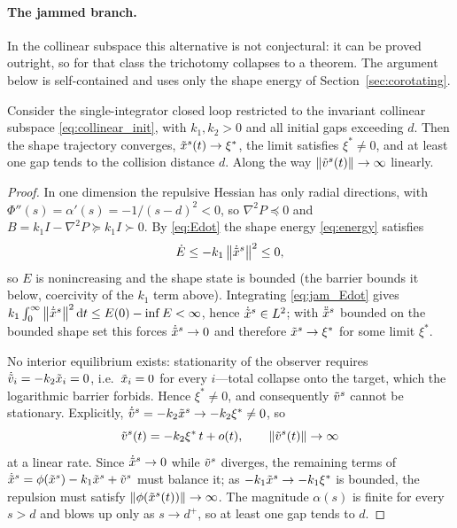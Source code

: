 \paragraph{The jammed branch.}
\label{sec:jam}
In the collinear subspace this alternative is not conjectural: it can be proved outright, so for that
class the trichotomy collapses to a theorem. The argument below is self-contained and uses only the shape
energy of Section~\ref{sec:corotating}.

\begin{proposition}\label{prop:jam}
Consider the single-integrator closed loop restricted to the invariant collinear subspace
\eqref{eq:collinear_init}, with $k_1,k_2>0$ and all initial gaps exceeding $d$. Then the shape
trajectory converges, $\tilde{x}^s(t)\to\xi^*$, the limit satisfies $\xi^*\ne0$, and at least one gap
tends to the collision distance $d$. Along the way $\left\| \tilde{v}^s(t) \right\|\to\infty$ linearly.
\end{proposition}

\begin{proof}
In one dimension the repulsive Hessian has only radial directions, with
$\Phi''(s)=\alpha'(s)=-1/(s-d)^2<0$, so $\nabla^2P\preceq0$ and
$B=k_1I-\nabla^2P\succeq k_1I\succ0$. By \eqref{eq:Edot} the shape energy \eqref{eq:energy} satisfies
\begin{equation}
  \dot E\le-k_1\left\| \dot{\tilde{x}}^s \right\|^2\le0 ,
  \label{eq:jam_Edot}
\end{equation}
so $E$ is nonincreasing and the shape state is bounded (the barrier bounds it below, coercivity of
the $k_1$ term above). Integrating \eqref{eq:jam_Edot} gives
$k_1\int_0^\infty\left\| \dot{\tilde{x}}^s \right\|^2\mathrm{d} t\le E(0)-\inf E<\infty$, hence
$\dot{\tilde{x}}^s\in L^2$; with $\ddot{\tilde{x}}^s$ bounded on the bounded shape set this forces
$\dot{\tilde{x}}^s\to0$ and therefore $\tilde{x}^s\to\xi^*$ for some limit $\xi^*$.

No interior equilibrium exists: stationarity of the observer requires $\dot{\tilde{v}}_i=-k_2\tilde{x}_i=0$,
i.e.\ $\tilde{x}_i=0$ for every $i$---total collapse onto the target, which the logarithmic barrier
forbids. Hence $\xi^*\ne0$, and consequently $\tilde{v}^s$ cannot be stationary. Explicitly,
$\dot{\tilde{v}}^s=-k_2\tilde{x}^s\to-k_2\xi^*\ne0$, so
\begin{equation}
  \tilde{v}^s(t)=-k_2\xi^*\,t+o(t),
  \qquad \left\| \tilde{v}^s(t) \right\|\to\infty
  \label{eq:jam_vdiv}
\end{equation}
at a linear rate. Since $\dot{\tilde{x}}^s\to0$ while $\tilde{v}^s$ diverges, the remaining terms of
$\dot{\tilde{x}}^s=\phi(\tilde{x}^s)-k_1\tilde{x}^s+\tilde{v}^s$ must balance it; as $-k_1\tilde{x}^s\to-k_1\xi^*$ is
bounded, the repulsion must satisfy $\left\| \phi(\tilde{x}^s(t)) \right\|\to\infty$. The magnitude $\alpha(s)$ is
finite for every $s>d$ and blows up only as $s\to d^+$, so at least one gap tends to $d$.
\end{proof}

